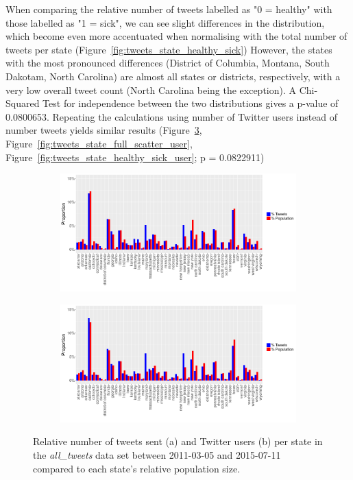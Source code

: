 \documentclass[11pt, a4paper]{report}\usepackage[]{graphicx}\usepackage[]{color}
\begin{document}
When comparing the relative number of tweets labelled as "0 = healthy" with those labelled as "1 = sick", we can see slight differences in the distribution, which become even more accentuated when normalising with the total number of tweets per state (Figure~\ref{fig:tweets_state_healthy_sick}) However, the states with the most pronounced differences (District of Columbia, Montana, South Dakotam, North Carolina) are almost all states or districts, respectively, with a very low overall tweet count (North Carolina being the exception). A Chi-Squared Test for independence between the two distributions gives a p-value of 0.0800653. Repeating the calculations using number of Twitter users instead of number tweets yields similar results (Figure~\ref{fig:tweets_state_full_user}, Figure~\ref{fig:tweets_state_full_scatter_user}, Figure~\ref{fig:tweets_state_healthy_sick_user}; p = 0.0822911)

\begin{figure}[h]
\centering
\begin{subfigure}[t]{1\textwidth}
  \includegraphics[width=1\linewidth]{activity_total_state_Twitter_full_aggregated.png}
  \caption{}
  \label{fig:tweets_state_full}
  \end{subfigure}
  
  \begin{subfigure}[t]{1\textwidth}
  \includegraphics[width=1\linewidth]{activity_total_user_state_Twitter_full_aggregated.png}
  \caption{}
    \label{fig:tweets_state_full_user}
  \end{subfigure}
\caption{Relative number of tweets sent (a) and Twitter users (b) per state in the \textit{all\_tweets} data set between 2011-03-05 and 2015-07-11 compared to each state's relative population size.}
\end{figure}
\end{document}
